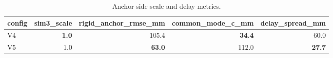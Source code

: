 \begin{table}[t]
\centering
\caption{Anchor-side scale and delay metrics.}
\label{tab:anchor_side}
\begin{tabular}{lrrrr}
\hline
config & sim3\_scale & rigid\_anchor\_rmse\_mm & common\_mode\_c\_mm & delay\_spread\_mm \\
\hline
V4 & \textbf{1.0} & 105.4 & \textbf{34.4} & 60.0 \\
V5 & 1.0 & \textbf{63.0} & 112.0 & \textbf{27.7} \\
\hline
\end{tabular}
\end{table}
